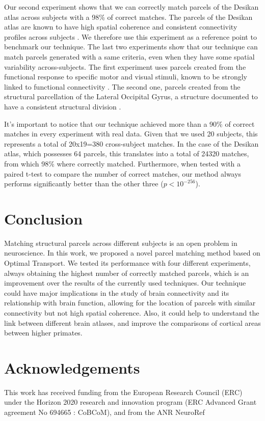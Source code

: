 Our second experiment shows that we can correctly match parcels of the Desikan atlas across subjects with a 98\% of correct matches. The parcels of the Desikan atlas are known to have high spatial coherence and consistent connectivity profiles across subjects \cite{DeReus2013}. We therefore use this experiment as a reference point to benchmark our technique.
The last two experiments show that our technique can match parcels generated with a same criteria, even when they have some spatial variability across-subjects. The first experiment uses parcels created from the functional response to specific motor and visual stimuli, known to be strongly linked to functional connectivity \cite{Osher2016, Penfield1954}. The second one, parcels created from the structural parcellation of the Lateral Occipital Gyrus, a structure documented to have a consistent structural division \cite{ThiebautdeSchotten2016, Gallardo2017a}. 

It's important to notice that our technique achieved more than a 90\% of correct matches in every experiment with real data. Given that we used 20 subjects, this represents a total of 20x19=380 cross-subject matches. In the case of the Desikan atlas, which possesses 64 parcels, this translates into a total of 24320 matches, from which 98\% where correctly matched. Furthermore, when tested with a paired t-test to compare the number of correct matches, our method always performs significantly better than the other three ($p<10^{-256}$).


\section{Conclusion}
Matching structural parcels across different subjects is an open problem in neuroscience. In this work, we proposed a novel parcel matching method based on Optimal Transport. We tested its performance with four different experiments, always obtaining the highest number of correctly matched parcels, which is an improvement over the results of the currently used techniques. Our technique could have major implications in the study of brain connectivity and its relationship with brain function, allowing for the location of parcels with similar connectivity but not high spatial coherence. Also, it could help to understand the link between different brain atlases, and improve the  comparisons of cortical areas between higher primates.

 \section*{Acknowledgements}
This work has received funding from the European Research Council (ERC) under the Horizon 2020 research and innovation program (ERC Advanced Grant agreement No 694665 : CoBCoM), and from the ANR NeuroRef

%
%
